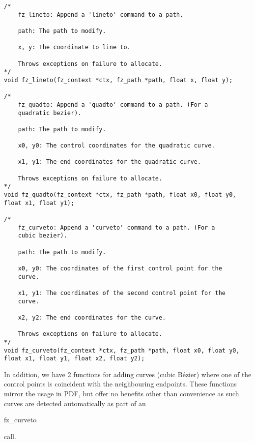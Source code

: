 \documentclass[oneside]{book}
\begin{document}
\begin{lstlisting}
/*
	fz_lineto: Append a 'lineto' command to a path.

	path: The path to modify.

	x, y: The coordinate to line to.

	Throws exceptions on failure to allocate.
*/
void fz_lineto(fz_context *ctx, fz_path *path, float x, float y);

/*
	fz_quadto: Append a 'quadto' command to a path. (For a
	quadratic bezier).

	path: The path to modify.

	x0, y0: The control coordinates for the quadratic curve.

	x1, y1: The end coordinates for the quadratic curve.

	Throws exceptions on failure to allocate.
*/
void fz_quadto(fz_context *ctx, fz_path *path, float x0, float y0, float x1, float y1);

/*
	fz_curveto: Append a 'curveto' command to a path. (For a
	cubic bezier).

	path: The path to modify.

	x0, y0: The coordinates of the first control point for the
	curve.

	x1, y1: The coordinates of the second control point for the
	curve.

	x2, y2: The end coordinates for the curve.

	Throws exceptions on failure to allocate.
*/
void fz_curveto(fz_context *ctx, fz_path *path, float x0, float y0, float x1, float y1, float x2, float y2);
\end{lstlisting}

In addition, we have 2 functions for adding curves (cubic Bézier) where one of the control points is coincident with the neighbouring endpoints. These functions mirror the usage in PDF, but offer no benefits other than convenience as such curves are detected automatically as part of an \begin{tt}fz\_curveto\end{tt} call.
\end{document}
